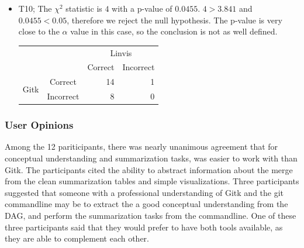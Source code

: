 \begin{itemize}
  \item

    T10; The $\chi^2$ statistic is $4$ with a p-value of $0.0455$.
    $4 > 3.841$ and $0.0455 < 0.05$, therefore we reject the null
    hypothesis. The p-value is very close to the $\alpha$ value in this
    case, so the conclusion is not as well defined.

    \begin{tabular}{cc|rr}
      &           & \multicolumn{2}{c}{Linvis}\\
      &           & Correct                      & Incorrect\\\hline
      \multirow{2}{*}{Gitk}   & Correct   & 14                           & 1\\
      & Incorrect & 8                            & 0\\
    \end{tabular}


\end{itemize}


\subsubsection{User Opinions}
\label{sub:user_opinions}

Among the 12 pariticipants, there was nearly unanimous agreement that
for conceptual understanding and summarization tasks, \tool was easier
to work with than Gitk. The participants cited the ability to abstract
information about the merge from the clean summarization tables and
simple visualizations. Three participants suggested that someone with a
professional understanding of Gitk and the git commandline may be to
extract the a good conceptual understanding from the DAG, and perform
the summarization tasks from the commandline. One of these three
participants said that they would prefer to have both tools available,
as they are able to complement each other.

